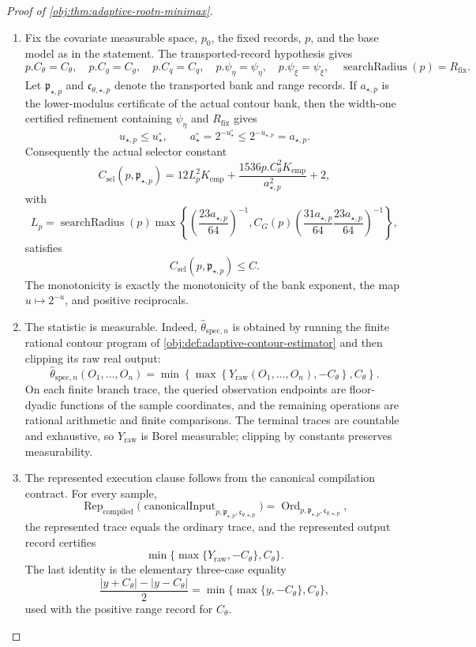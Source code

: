 \documentclass[11pt]{article}
\begin{document}
\begin{proof}[Proof of \cref{obj:thm:adaptive-rootn-minimax}]
\begin{enumerate}
\item Fix the covariate measurable space, \(p_0\), the fixed records, \(p\), and the base model as in the statement.  The transported-record hypothesis gives
\[
p.C_{\theta}=C_{\theta},\quad p.C_g=C_g,\quad p.C_q=C_q,\quad p.\psi_{\eta}=\psi_{\eta},\quad p.\psi_{\xi}=\psi_{\xi},
\quad \operatorname{searchRadius}(p)=R_{\mathrm{fix}}.
\]
Let \(\mathfrak p_{\star,p}\) and \(\mathfrak c_{\theta,\star,p}\) denote the transported bank and range records.  If \(a_{\star,p}\) is the lower-modulus certificate of the actual contour bank, then the width-one certified refinement containing \(\psi_{\eta}\) and \(R_{\mathrm{fix}}\) gives
\[
u_{\star,p}\le u_{\star}^{\circ},
\qquad
a_{\star}^{\circ}=2^{-u_{\star}^{\circ}}\le 2^{-u_{\star,p}}=a_{\star,p}.
\]
Consequently the actual selector constant
\[
C_{\mathrm{sel}}(p,\mathfrak p_{\star,p})
=
12L_p^2K_{\mathrm{emp}}
+\frac{1536p.C_{\theta}^2K_{\mathrm{emp}}}{a_{\star,p}^2}
+2,
\]
with
\[
L_p
=
\operatorname{searchRadius}(p)
\max\left\{
\left(\frac{23a_{\star,p}}{64}\right)^{-1},
C_G(p)
\left(\frac{31a_{\star,p}}{64}\frac{23a_{\star,p}}{64}\right)^{-1}
\right\},
\]
satisfies
\[
C_{\mathrm{sel}}(p,\mathfrak p_{\star,p})\le C.
\]
The monotonicity is exactly the monotonicity of the bank exponent, the map \(u\mapsto 2^{-u}\), and positive reciprocals. %

\item The statistic is measurable.  Indeed, \(\widehat\theta_{\mathrm{spec},n}\) is obtained by running the finite rational contour program of \cref{obj:def:adaptive-contour-estimator} and then clipping its raw real output:
\[
\widehat\theta_{\mathrm{spec},n}(O_1,\ldots,O_n)
=
\min\left\{
\max\left\{Y_{\mathrm{raw}}(O_1,\ldots,O_n),-C_{\theta}\right\},
C_{\theta}
\right\}.
\]
On each finite branch trace, the queried observation endpoints are floor-dyadic functions of the sample coordinates, and the remaining operations are rational arithmetic and finite comparisons.  The terminal traces are countable and exhaustive, so \(Y_{\mathrm{raw}}\) is Borel measurable; clipping by constants preserves measurability. %

\item The represented execution clause follows from the canonical compilation contract.  For every sample,
\[
\operatorname{Rep}_{\mathrm{compiled}}
\bigl(\operatorname{canonicalInput}_{p,\mathfrak p_{\star,p},\mathfrak c_{\theta,\star,p}}\bigr)
=
\operatorname{Ord}_{p,\mathfrak p_{\star,p},\mathfrak c_{\theta,\star,p}},
\]
the represented trace equals the ordinary trace, and the represented output record certifies
\[
\min\{\max\{Y_{\mathrm{raw}},-C_{\theta}\},C_{\theta}\}.
\]
The last identity is the elementary three-case equality
\[
\frac{|y+C_{\theta}|-|y-C_{\theta}|}{2}
=
\min\{\max\{y,-C_{\theta}\},C_{\theta}\},
\]
used with the positive range record for \(C_{\theta}\). %


\end{enumerate}
\end{proof}
\end{document}
